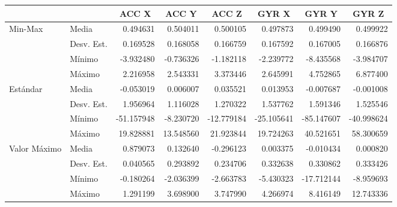 \begin{landscape}
\pagestyle{empty}
\begin{table}[p!]

\centering
\begin{tabular}{ll|r|r|r|r|r|r|}
\cline{3-8}
 &  & \multicolumn{1}{c|}{\textbf{ACC X}} & \multicolumn{1}{c|}{\textbf{ACC Y}} & \multicolumn{1}{c|}{\textbf{ACC Z}} & \multicolumn{1}{c|}{\textbf{GYR X}} & \multicolumn{1}{c|}{\textbf{GYR Y}} & \multicolumn{1}{c|}{\textbf{GYR Z}} \\ \hline
\multicolumn{1}{|l|}{\multirow{4}{*}{Min-Max}} & Media & 0.494631 & 0.504011 & 0.500105 & 0.497873 & 0.499490 & 0.499922 \\ \cline{2-8} 
\multicolumn{1}{|l|}{}                  & Desv. Est. & 0.169528 & 0.168058 & 0.166759 & 0.167592 & 0.167005 & 0.166876 \\ \cline{2-8} 
\multicolumn{1}{|l|}{}                  & M\'{i}nimo & -3.932480 & -0.736326	& -1.182118 & -2.239772 & -8.435568 & -3.984707 \\ \cline{2-8} 
\multicolumn{1}{|l|}{}                  & M\'{a}ximo & 2.216958 & 2.543331 & 3.373446 & 2.645991 & 4.752865 & 6.877400 \\ \hline
\multicolumn{1}{|l|}{\multirow{4}{*}{Est\'{a}ndar}} & Media & -0.053019 & 0.006007 & 0.035521 & 0.013953 & -0.007687 & -0.001008 \\ \cline{2-8} 
\multicolumn{1}{|l|}{}                  & Desv. Est. & 1.956964 & 1.116028 & 1.270322 & 1.537762 & 1.591346 & 1.525546 \\ \cline{2-8} 
\multicolumn{1}{|l|}{}                  & M\'{i}nimo & -51.157948 & -8.230720 & -12.779184 & -25.105641 & -85.147607 & -40.998624 \\ \cline{2-8} 
\multicolumn{1}{|l|}{}                  & M\'{a}ximo & 19.828881 & 13.548560 & 21.923844 & 19.724263 & 40.521651 & 58.300659 \\ \hline
\multicolumn{1}{|l|}{\multirow{4}{*}{Valor M\'{a}ximo}} & Media & 0.879073 & 0.132640 & -0.296123 & 0.003375 & -0.010434 & 0.000820 \\ \cline{2-8} 
\multicolumn{1}{|l|}{}                  & Desv. Est. & 0.040565 & 0.293892 & 0.234706 & 0.332638 & 0.330862 & 0.333426 \\ \cline{2-8} 
\multicolumn{1}{|l|}{}                  & M\'{i}nimo & -0.180264 & -2.036399	& -2.663783 & -5.430323 & -17.712144 & -8.959693 \\ \cline{2-8} 
\multicolumn{1}{|l|}{}                  & M\'{a}ximo & 1.291199 & 3.698900 & 3.747990 & 4.266974 & 8.416149 & 12.743336 \\ \hline

\end{tabular}
\end{table}
\end{landscape}
